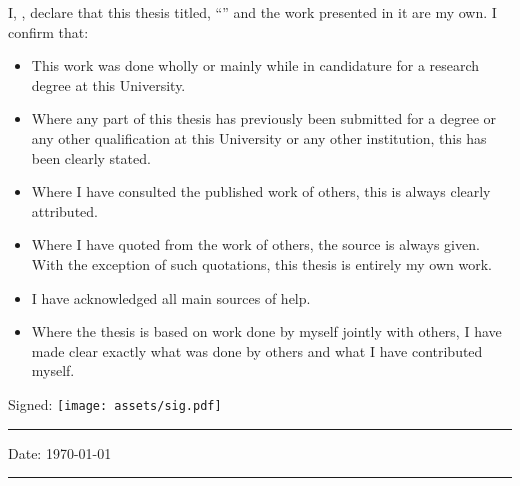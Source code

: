 \begin{declaration}
    \addchaptertocentry{\authorshipname} %
    \noindent I, \authorname, declare that this thesis titled, \enquote{\ttitle} and the work presented in it are my own. I confirm that:

    \begin{itemize}
        \item This work was done wholly or mainly while in candidature for a research degree at this University.
        \item Where any part of this thesis has previously been submitted for a degree or any other qualification at this University or any other institution, this has been clearly stated.
        \item Where I have consulted the published work of others, this is always clearly attributed.
        \item Where I have quoted from the work of others, the source is always given. With the exception of such quotations, this thesis is entirely my own work.
        \item I have acknowledged all main sources of help.
        \item Where the thesis is based on work done by myself jointly with others, I have made clear exactly what was done by others and what I have contributed myself.\\
    \end{itemize}

    \noindent Signed: \texttt{[image: assets/sig.pdf]} \\
    \rule[0.5em]{25em}{0.5pt} %

    \noindent Date: \today \\
    \rule[0.5em]{25em}{0.5pt} %
\end{declaration}

\cleardoublepage